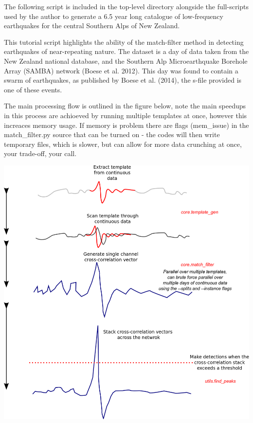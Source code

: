 \documentclass[a4paper,10pt,english]{sphinxmanual}
\begin{document}
The following script is included in the top-level directory alongside the full-scripts
used by the author to generate a 6.5 year long catalogue of low-frequency earthquakes
for the central Southern Alps of New Zealand.

This tutorial script highlights the ability of the match-filter method in detecting
earthquakes of near-repeating nature.  The dataset is a day of data taken from the
New Zealand national database, and the Southern Alp Microearthquake Borehole Array
(SAMBA) network (Boese et al. 2012).  This day was found to contain a swarm of
earthquakes, as published by Boese et al. (2014), the s-file provided is one of
these events.

The main processing flow is outlined in the figure below, note the main speedups
in this process are achioeved by running multiple templates at once, however this
increaces memory usage.  If memory is problem there are flags (mem\_issue) in the
match\_filter.py source that can be turned on - the codes will then write temporary
files, which is slower, but can allow for more data crunching at once, your trade-off,
your call.

{\hfill\includegraphics{processing_flow.png}\hfill}
\end{document}
